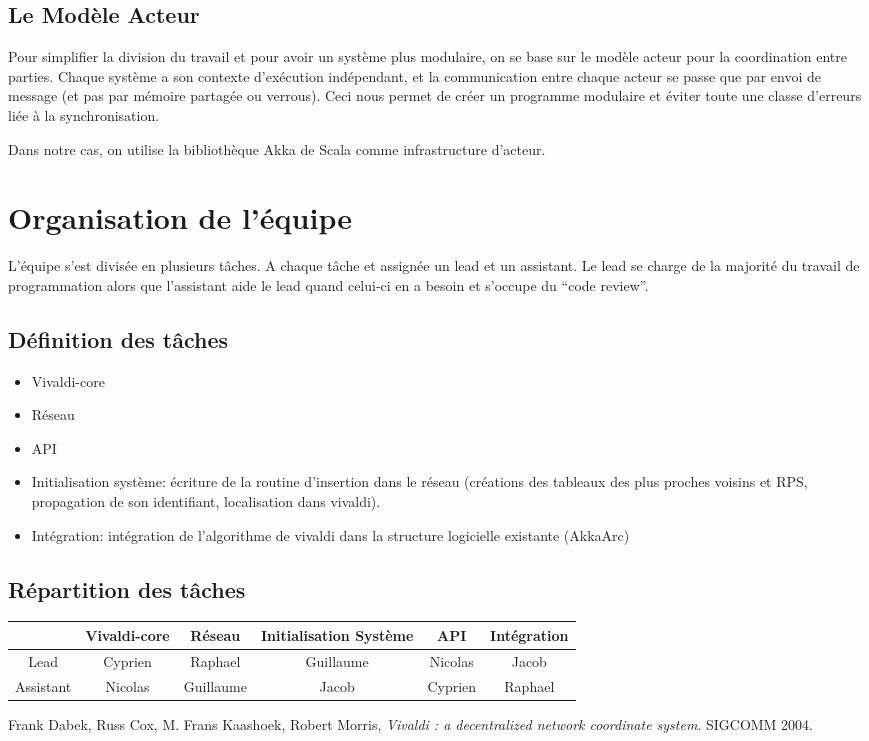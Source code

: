 \documentclass[11pt,a4paper]{article}
\begin{document}
\subsection{Le Modèle Acteur}

  Pour simplifier la division du travail et pour avoir un système plus modulaire, on se base sur le modèle acteur pour la coordination entre parties. Chaque système a son contexte d’exécution indépendant, et la communication entre chaque acteur se passe que par envoi de message (et pas par mémoire partagée ou verrous). Ceci nous permet de créer un programme modulaire et éviter toute une classe d’erreurs liée à la synchronisation.

 Dans notre cas,  on utilise la bibliothèque Akka de Scala comme infrastructure d’acteur.

\section{Organisation de l’équipe}

L’équipe s’est divisée en plusieurs tâches. A chaque tâche et assignée un lead et un assistant. Le lead se charge de la majorité du travail de programmation alors que l’assistant aide le lead quand celui-ci en a besoin et s’occupe du “code review”. 

\subsection{Définition des tâches}
\begin{itemize}
\item Vivaldi-core
\item Réseau
\item API
\item Initialisation système: écriture de la routine d’insertion dans le réseau (créations des tableaux des plus proches voisins et RPS, propagation de son identifiant, localisation dans vivaldi).
\item Intégration: intégration de l’algorithme de vivaldi dans la structure logicielle existante (AkkaArc)
\end{itemize}

\subsection{Répartition des tâches}
\begin{tabular}{|c|c|c|c|c|c|}
  \hline
  & Vivaldi-core & Réseau & Initialisation Système & API & Intégration \\
  \hline
  Lead & Cyprien & Raphael & Guillaume & Nicolas & Jacob \\
  \hline
  Assistant & Nicolas & Guillaume & Jacob & Cyprien & Raphael \\
  \hline
\end{tabular}
\begin{thebibliography}{9}

  Frank Dabek, Russ Cox, M. Frans Kaashoek, Robert Morris,
  \emph{Vivaldi : a decentralized network coordinate system}.
  SIGCOMM 2004.

\end{thebibliography}
\end{document}
